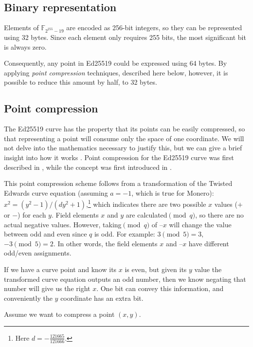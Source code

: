 \subsection{Binary representation}
\label{binary_note}
Elements of \(\mathbb{F}_{2^{255} - 19} \) are encoded as 256-bit integers, so they can be represented using 32 bytes. Since each element only requires 255 bits, the most significant bit is always zero.

Consequently, any point in Ed25519 could be expressed using 64 bytes. By applying {\em point compression} techniques, described here below, however, it is possible to reduce this amount by half, to 32 bytes.


\subsection{Point compression}
\label{point_compression_section}

The Ed25519 curve has the property that its points can be easily compressed, so that representing a point will consume only the space of one coordinate. We will not delve into the mathematics necessary to justify this, but we can give a brief insight into how it works \cite{eddsa-ed25519-irtf}. Point compression for the Ed25519 curve was first described in \cite{Bernstein2012}, while the concept was first introduced in \cite{Miller:point-compression-origin}.

This point compression scheme follows from a transformation of the Twisted Edwards curve equation (assuming $a = -1$, which is true for Monero): $x^2 = (y^2-1)/(d y^2+1)$,\footnote{Here $d = - \frac{121665}{121666}$.} which indicates there are two possible $x$ values ($+$ or $-$) for each $y$. Field elements $x$ and $y$ are calculated$\pmod{q}$, so there are no actual negative values. However, taking$\pmod{q}$ of $–x$ will change the value between odd and even since $q$ is odd. For example: $3 \pmod{5} = 3$, $-3 \pmod{5} = 2$. In other words, the field elements $x$ and $–x$ have different odd/even assignments.

If we have a curve point and know its $x$ is even, but given its $y$ value the transformed curve equation outputs an odd number, then we know negating that number will give us the right $x$. One bit can convey this information, and conveniently the $y$ coordinate has an extra bit.

Assume we want to compress a point \((x, y)\).

